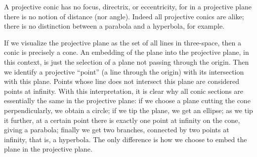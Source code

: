 \documentclass[12pt]{article}
\begin{document}
A projective conic has no focus, directrix, or eccentricity, for in a
projective plane there is no notion of distance (nor angle).
Indeed all projective conics are alike; there is no distinction between a parabola and a hyperbola, for example.

If we visualize the projective plane as the set of all lines in three-space, then a conic is precisely a cone. An embedding of the plane into the projective plane, in this context, is just the selection of a plane not passing through the origin.  Then we identify a projective ``point'' (a line through the origin) with its intersection with this plane. Points whose line does not intersect this plane are considered points at infinity. With this interpretation, it is clear why all conic sections are essentially the same in the projective plane: if we choose a plane cutting the cone perpendicularly, we obtain a circle; if we tip the plane, we get an ellipse; as we tip it further, at a certain point there is exactly one point at infinity on the cone, giving a parabola; finally we get two branches, connected by two points at infinity, that is, a hyperbola. The only difference is how we choose to embed the plane in the projective plane.
\end{document}
